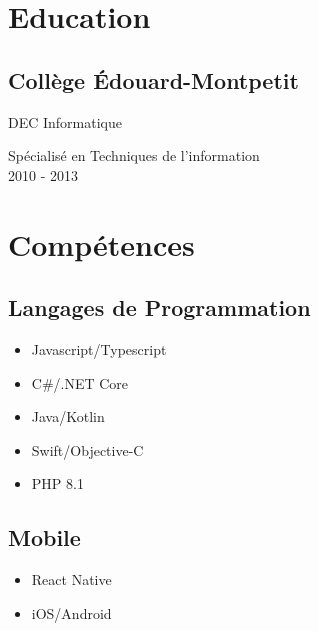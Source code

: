 \documentclass{article}
\begin{document}
\setlength{\columnsep}{4em}
\setlength{\columnseprule}{0.4pt}
\begin{paracol}{2}
  \begin{leftcolumn}
    \vspace{-2.5em}
    \section{Education}

    \subsection{Collège Édouard-Montpetit}
    {DEC Informatique\par}
    Spécialisé en Techniques de l'information \\
    2010 - 2013

    \section{Compétences}

    \subsection{Langages de Programmation}
    \begin{itemize}
      \item Javascript/Typescript
      \item C\#/.NET Core
      \item Java/Kotlin
      \item Swift/Objective-C
      \item PHP 8.1
    \end{itemize}

    \vspace{0.5em}

    \subsection{Mobile}
    \begin{itemize}
      \item React Native
      \item iOS/Android
    \end{itemize}


\end{leftcolumn}
\end{paracol}
\end{document}
